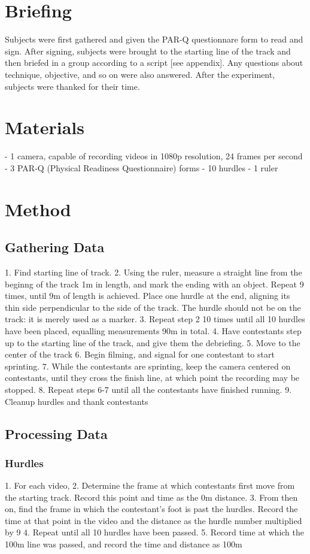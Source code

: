\documentclass[index]{subfiles}
\begin{document}
\section{Briefing}
Subjects were first gathered and given the PAR-Q questionnare form to read and sign. After signing, subjects were brought to the starting line of the track and then briefed in a group according to a script [see appendix]. Any questions about technique, objective, and so on were also answered. After the experiment, subjects were thanked for their time.

\section{Materials}
- 1 camera, capable of recording videos in 1080p resolution, 24 frames per second
- 3 PAR-Q (Physical Readiness Questionnaire) forms
- 10 hurdles
- 1 ruler

\section{Method}
\subsection{Gathering Data}
1. Find starting line of track.
2. Using the ruler, measure a straight line from the beginng of the track 1m in length, and mark the ending with an object. Repeat 9 times, until 9m of length is achieved. Place one hurdle at the end, aligning its thin side perpendicular to the side of the track. The hurdle should not be on the track: it is merely used as a marker.
3. Repeat step 2 10 times until all 10 hurdles have been placed, equalling measurements 90m in total.
4. Have contestants step up to the starting line of the track, and give them the debriefing.
5. Move to the center of the track
6. Begin filming, and signal for one contestant to start sprinting.
7. While the contestants are sprinting, keep the camera centered on contestants, until they cross the finish line, at which point the recording may be stopped.
8. Repeat steps 6-7 until all the contestants have finished running.
9. Cleanup hurdles and thank contestants
\subsection{Processing Data}
\subsubsection{Hurdles}
1. For each video,
2. Determine the frame at which contestants first move from the starting track. Record this point and time as the 0m distance.
3. From then on, find the frame in which the contestant's foot is past the hurdles. Record the time at that point in the video and the distance as the hurdle number multiplied by 9
4. Repeat until all 10 hurdles have been passed.
5. Record time at which the 100m line was passed, and record the time and distance as 100m
\end{document}
